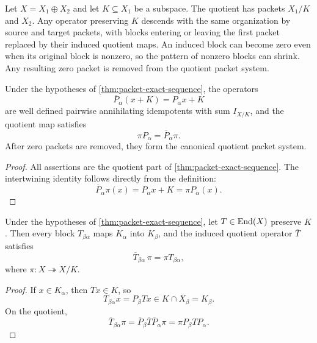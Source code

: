 \begin{microexample}[title={Packet descent to a quotient}]
Let \(X=X_1\oplus X_2\) and let \(K\subseteq X_1\) be a subspace.  The quotient has packets \(X_1/K\) and \(X_2\).  Any operator preserving \(K\) descends with the same organization by source and target packets, with blocks entering or leaving the first packet replaced by their induced quotient maps.  An induced block can become zero even when its original block is nonzero, so the pattern of nonzero blocks can shrink.  Any resulting zero packet is removed from the quotient packet system.
\end{microexample}


\begin{theorem}
\label{thm:quotient-packet-descent}
Under the hypotheses of \cref{thm:packet-exact-sequence}, the operators
\[
\overline P_\alpha(x+K)=P_\alpha x+K
\]
are well defined pairwise annihilating idempotents with sum $I_{X/K}$, and the quotient map satisfies
\[
\boxed{\pi P_\alpha=\overline P_\alpha\pi.}
\]
After zero packets are removed, they form the canonical quotient packet system.
\end{theorem}

\begin{proof}
All assertions are the quotient part of \cref{thm:packet-exact-sequence}.  The intertwining identity follows directly from the definition:
\[
\overline P_\alpha\pi(x)=P_\alpha x+K=\pi P_\alpha(x).
\]
\end{proof}

\begin{corollary}
\label{cor:block-descent}
Under the hypotheses of \cref{thm:packet-exact-sequence}, let $T\in\operatorname{End}(X)$ preserve $K$.  Then every block $T_{\beta\alpha}$ maps $K_\alpha$ into $K_\beta$, and the induced quotient operator $\overline T$ satisfies
\[
\boxed{
\overline T_{\beta\alpha}\,\pi
=
\pi T_{\beta\alpha},
}
\]
where $\pi:X\twoheadrightarrow X/K$.
\end{corollary}

\begin{proof}
If $x\in K_\alpha$, then $Tx\in K$, so
\[
T_{\beta\alpha}x=P_\beta Tx\in K\cap X_\beta=K_\beta.
\]
On the quotient,
\[
\overline T_{\beta\alpha}\pi
=
\overline P_\beta\overline T\overline P_\alpha\pi
=
\pi P_\beta TP_\alpha.
\]
\end{proof}


